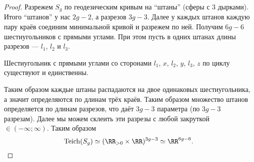 \documentclass[12pt,a4paper]{article}
\newcommand{\Teich}{\mathrm{Teich}}
\begin{document}
    \begin{proof}
        Разрежем $S_g$ по геодезическим кривым на ``штаны'' (сферы с 3 дырками). Итого ``штанов'' у нас $2g-2$, а разрезов $3g-3$. Далее у каждых штанов каждую пару краёв соединим минимальной кривой и разрежем по ней. Получим $6g-6$ шестиугольников с прямыми углами. При этом пусть в одних штанах длины разрезов --- $l_1$, $l_2$ и $l_3$.
        
        \begin{lemma}
            Шестиугольник с прямыми углами со сторонами $l_1$, $x$, $l_2$, $y$, $l_3$, $z$ по циклу существуют и единственны.
        \end{lemma}

        Таким образом каждые штаны распадаются на двое одинаковых шестиугольника, а значит определяются по длинам трёх краёв. Таким образом множество штанов определяется по длинам разрезов, что даёт $3g-3$ параметра (по $3g-3$ разрезам). Далее мы можем склеить эти разрезы с любой закруткой $\in (-\infty; \infty)$. Таким образом
        \[\Teich(S_g) \simeq (\RR_{>0} \times \RR)^{3g-3} \simeq \RR^{6g-6}.\]
    \end{proof}
\end{document}
